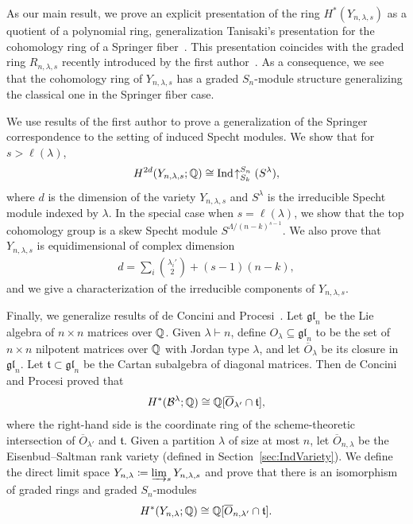 \documentclass[12pt]{amsart}
\newcommand{\la}{\lambda}
\begin{document}
As our main result, we prove an explicit presentation of the ring $H^*(Y_{n,\la,s})$ as a quotient of a polynomial ring, generalization Tanisaki's presentation for the cohomology ring of a Springer fiber~\cite{Tanisaki}. This presentation coincides with the graded ring $R_{n,\lambda,s}$ recently introduced by the first author~\cite{GriffinOSP}. 
As a consequence, we see that the cohomology ring of $Y_{n,\lambda,s}$ has a graded $S_n$-module structure generalizing the classical one in the Springer fiber case.

We use results of the first author to prove a generalization of the  Springer correspondence to the setting of induced Specht modules. We show that for $s>\ell(\lambda)$, 
\begin{align}
H^{2d}(Y_{n,\lambda,s};\mathbb{Q}) \cong \mathrm{Ind}\!\uparrow_{S_k}^{S_n} (S^\lambda),
\end{align}
where $d$ is the dimension of the variety $Y_{n,\lambda,s}$ and $S^\la$ is the irreducible Specht module indexed by $\lambda$. In the special case when $s=\ell(\lambda)$, we show that the top cohomology group is a skew Specht module $S^{\Lambda/(n-k)^{s-1}}$. We also prove that $Y_{n,\lambda,s}$ is equidimensional of complex dimension
\begin{align}
    d = \sum_i \binom{\lambda_i'}{2} + (s-1)(n-k),
\end{align}
and we give a characterization of the irreducible components of $Y_{n,\la,s}$.

Finally, we generalize results of de Concini and Procesi~\cite{dCP}. Let $\mathfrak{gl}_n$ be the Lie algebra of $n\times n$ matrices over $\mathbb{Q}$. Given $\la\vdash n$, define $O_\lambda\subseteq \mathfrak{gl}_n$ to be the set of $n\times n$ nilpotent matrices over $\mathbb{Q}$ with Jordan type $\lambda$, and let $\overline{O}_\lambda$ be its closure in $\mathfrak{gl}_n$. Let $\mathfrak{t}\subset \mathfrak{gl}_n$ be the Cartan subalgebra of diagonal matrices. Then de Concini and Procesi proved that
\begin{align}
    H^*(\cB^\la;\bQ) \cong \bQ[\overline{O}_{\la'}\cap \mathfrak{t}],
\end{align}
where the right-hand side is the coordinate ring of the scheme-theoretic intersection of $\overline{O}_{\la'}$ and $\mathfrak{t}$. Given a partition $\lambda$ of size at most $n$, let $\overline{O}_{n,\la}$ be the Eisenbud--Saltman rank variety (defined in Section~\ref{sec:IndVariety}). We define the direct limit space $Y_{n,\la} \coloneqq \varinjlim_s Y_{n,\la,s}$ and prove that there is an isomorphism of graded rings and graded $S_n$-modules
\begin{align}\label{eq:dCPGeneralization}
    H^*(Y_{n,\la};\bQ) \cong \bQ[\overline{O}_{n,\la'}\cap \mathfrak{t}].
\end{align}
\end{document}

